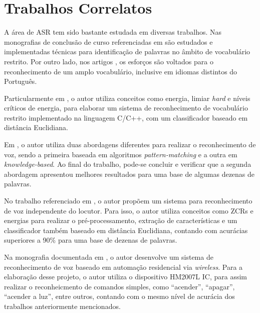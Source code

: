 \documentclass[a4paper,12pt,twoside,openright]{report}
\begin{document}
\section{Trabalhos Correlatos}
\label{trabalhos_correlatos}
\par A \'{a}rea de ASR tem sido bastante estudada em diversas trabalhos. Nas monografias de conclus\~{a}o de curso referenciadas em \cite{Marcel_Kfouri,Vinicius_Francisco,Ana_Paula,Joao_Vitor_Maschio,Reconhecimento_Comandos_Falados_Portugues_Brasileiro,Reconhecimento_voz_palavras_isoladas,Reconhecimento_automatico_fala_computador,Reconhecimento_padrao_formato_wave} s\~{a}o estudados e implementadas t\'{e}cnicas para identifica\c{c}\~{a}o de palavras no \^{a}mbito de vocabul\'{a}rio restrito. Por outro lado, nos artigos \cite{reconhecimento_vocabulario_chines,Reconhecimento_vocabulario_russo}, os esfor{\c c}os s\~{a}o voltados para o reconhecimento de um amplo vocabul\'{a}rio, inclusive em idiomas distintos do Portugu\^{e}s.
\\
\par Particularmente em \cite{Marcel_Kfouri}, o autor utiliza conceitos como energia, limiar \textit{hard} e n\'{i}veis cr\'{i}ticos de energia, para elaborar um sistema  de reconhecimento de vocabul\'{a}rio restrito implementado na linguagem C/C++, com um classificador baseado em dist\^{a}ncia Euclidiana.
\\
\par Em \cite{Ana_Paula}, o autor utiliza duas abordagens diferentes para realizar o reconhecimento de voz, sendo a primeira baseada em algoritmos \textit{pattern-matching} e a outra em \textit{knowledge-based}. Ao final do trabalho, pode-se concluir e verificar que a segunda abordagem apresentou melhores resultados para uma base de algumas dezenas de palavras.
\\
\par No trabalho referenciado em \cite{Joao_Vitor_Maschio}, o autor prop\~{o}em um sistema para reconhecimento de voz independente do locutor. Para isso, o autor utiliza conceitos como ZCRs e energias para realizar o pr\'{e}-processamento, extra{\c c}\~{a}o de caracter\'{i}sticas e um classificador tamb\'{e}m baseado em dist\^{a}ncia Euclidiana, contando com acur\'{a}cias superiores a 90\% para uma base de dezenas de palavras.
\\
\par Na monografia documentada em \cite{Voice_recognition_Room_automation}, o autor desenvolve um sistema de reconhecimento de voz baseado em automa{\c c}\~{a}o residencial via \textit{wireless}. Para a elabora{\c c}\~{a}o desse projeto, o autor utiliza o dispositivo HM2007L IC, para assim realizar o reconheicmento de comandos simples, como ``acender'', ``apagar'', ``acender a luz'', entre outros, contando com o mesmo n\'{i}vel de acur\'{a}cia dos trabalhos anteriormente mencionados.
\end{document}
